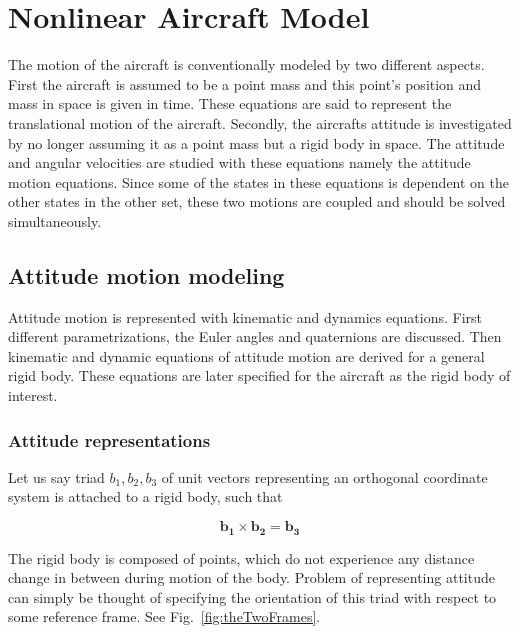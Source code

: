 \chapter{Nonlinear Aircraft Model}

The motion of the aircraft is conventionally modeled by two different aspects. First the aircraft is assumed to be a point mass and this point\textquoteright s position and mass in space is given in time. These equations are said to represent the translational motion of the aircraft. Secondly, the aircrafts attitude is investigated by no longer assuming it as a point mass but a rigid body in space. The attitude and angular velocities are studied with these equations namely the attitude motion equations. Since some of the states in these equations is dependent on the other states in the other set, these two motions are coupled and should be solved simultaneously.
  
\section{Attitude motion modeling}
Attitude motion is represented with kinematic and dynamics equations. First different parametrizations, the Euler angles and quaternions are discussed. Then kinematic and dynamic equations of attitude motion are derived for a general rigid body. These equations are later specified for the aircraft as the rigid body of interest. 
\subsection{Attitude representations}
Let us say triad $b_1, b_2, b_3$ of unit vectors representing an orthogonal 
coordinate system is attached to a rigid body, such that

\begin{equation}
\label{eqn:unitVectors}
\bm{b_1}\times \bm{b_2}= \bm{b_3}
\end{equation}

The rigid body is composed of points, which do not experience any distance 
change in between during motion of the body. Problem of representing attitude 
can simply be thought of specifying the orientation of this triad with respect to 
some reference frame. See Fig.~\ref{fig:theTwoFrames}.

